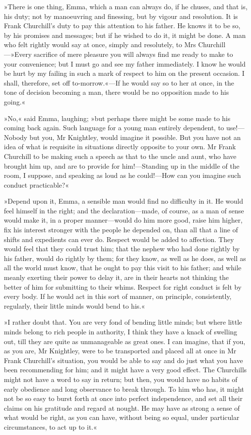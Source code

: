 »There is one thing, Emma, which a man can always do, if he chuses, and that is, his duty; not by manoeuvring and finessing, but by vigour and resolution. It is Frank Churchill's duty to pay this attention to his father. He knows it to be so, by his promises and messages; but if he wished to do it, it might be done. A man who felt rightly would say at once, simply and resolutely, to Mrs Churchill—»Every sacrifice of mere pleasure you will always find me ready to make to your convenience; but I must go and see my father immediately. I know he would be hurt by my failing in such a mark of respect to him on the present occasion. I shall, therefore, set off to-morrow.«—If he would say so to her at once, in the tone of decision becoming a man, there would be no opposition made to his going.«

»No,« said Emma, laughing; »but perhaps there might be some made to his coming back again. Such language for a young man entirely dependent, to use!—Nobody but you, Mr Knightley, would imagine it possible. But you have not an idea of what is requisite in situations directly opposite to your own. Mr Frank Churchill to be making such a speech as that to the uncle and aunt, who have brought him up, and are to provide for him!—Standing up in the middle of the room, I suppose, and speaking as loud as he could!—How can you imagine such conduct practicable?«

»Depend upon it, Emma, a sensible man would find no difficulty in it. He would feel himself in the right; and the declaration—made, of course, as a man of sense would make it, in a proper manner—would do him more good, raise him higher, fix his interest stronger with the people he depended on, than all that a line of shifts and expedients can ever do. Respect would be added to affection. They would feel that they could trust him; that the nephew who had done rightly by his father, would do rightly by them; for they know, as well as he does, as well as all the world must know, that he ought to pay this visit to his father; and while meanly exerting their power to delay it, are in their hearts not thinking the better of him for submitting to their whims. Respect for right conduct is felt by every body. If he would act in this sort of manner, on principle, consistently, regularly, their little minds would bend to his.«

»I rather doubt that. You are very fond of bending little minds; but where little minds belong to rich people in authority, I think they have a knack of swelling out, till they are quite as unmanageable as great ones. I can imagine, that if you, as you are, Mr Knightley, were to be transported and placed all at once in Mr Frank Churchill's situation, you would be able to say and do just what you have been recommending for him; and it might have a very good effect. The Churchills might not have a word to say in return; but then, you would have no habits of early obedience and long observance to break through. To him who has, it might not be so easy to burst forth at once into perfect independence, and set all their claims on his gratitude and regard at nought. He may have as strong a sense of what would be right, as you can have, without being so equal, under particular circumstances, to act up to it.«

